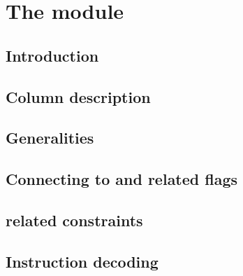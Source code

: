 
\section{The \romMod{} module}                                   \label{rom}
\subsection{Introduction}                                        \label{rom: intro}                        
\subsection{Column description}                                  \label{rom: columns}                      
\subsection{Generalities}                                        \label{rom: constraints}                  
\subsection{Connecting \pbcb{} to \opc{} and related flags}      \label{rom: opcode related constraints}   
\subsection{ related constraints}                     \label{rom: push related constraints}     
\subsection{Instruction decoding}                                \label{rom: instruction decoding}         
